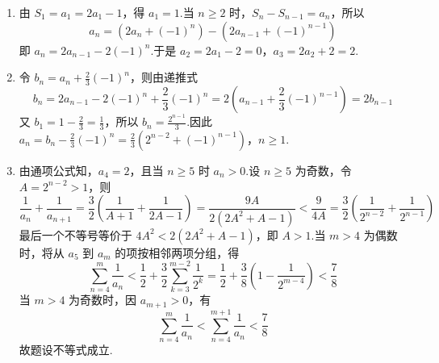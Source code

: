 \begin{solution}
\begin{enumerate}
\item 由 \(S_1=a_1=2a_1-1\)，得 \(a_1=1\).当 \(n\geqslant2\) 时，\(S_n-S_{n-1}=a_n\)，所以
\[
a_n=\left(2a_n+(-1)^n\right)-\left(2a_{n-1}+(-1)^{n-1}\right)
\]
即 \(a_n=2a_{n-1}-2(-1)^n\).于是 \(a_2=2a_1-2=0\)，\(a_3=2a_2+2=2\).
\item 令 \(b_n=a_n+\frac23(-1)^n\)，则由递推式
\[
b_n=2a_{n-1}-2(-1)^n+\frac23(-1)^n=2\left(a_{n-1}+\frac23(-1)^{n-1}\right)=2b_{n-1}
\]
又 \(b_1=1-\frac23=\frac13\)，所以 \(b_n=\frac{2^{n-1}}3\).因此
\(a_n=b_n-\frac23(-1)^n=\frac23\left(2^{n-2}+(-1)^{n-1}\right)\)，\(n\geqslant1\).
\item 由通项公式知，\(a_4=2\)，且当 \(n\geqslant5\) 时 \(a_n>0\).设 \(n\geqslant5\) 为奇数，令 \(A=2^{n-2}>1\)，则
\[
\frac1{a_n}+\frac1{a_{n+1}}=\frac32\left(\frac1{A+1}+\frac1{2A-1}\right)=\frac{9A}{2(2A^2+A-1)}<\frac{9}{4A}=\frac32\left(\frac1{2^{n-2}}+\frac1{2^{n-1}}\right)
\]
最后一个不等号等价于 \(4A^2<2(2A^2+A-1)\)，即 \(A>1\).当 \(m>4\) 为偶数时，将从 \(a_5\) 到 \(a_m\) 的项按相邻两项分组，得
\[
\sum_{n=4}^{m}\frac1{a_n}
<\frac12+\frac32\sum_{k=3}^{m-2}\frac1{2^k}=\frac12+\frac38\left(1-\frac1{2^{m-4}}\right)<\frac78
\]
当 \(m>4\) 为奇数时，因 \(a_{m+1}>0\)，有
\[
\sum_{n=4}^{m}\frac1{a_n}<\sum_{n=4}^{m+1}\frac1{a_n}<\frac78
\]
故题设不等式成立.
\end{enumerate}
\end{solution}
